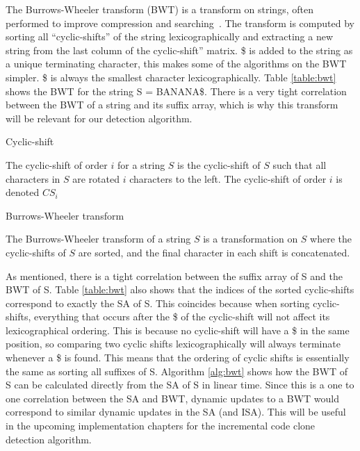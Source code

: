 The Burrows-Wheeler transform (BWT) is a transform on strings, often performed to improve
compression and searching~\cite{BWT}. The transform is computed by sorting all
``cyclic-shifts'' of the string lexicographically and extracting a new string from the
last column of the cyclic-shift'' matrix. \$ is added to the string as a unique
terminating character, this makes some of the algorithms on the BWT simpler. \$ is always
the smallest character lexicographically. Table \ref{table:bwt} shows the BWT for the
string S = BANANA\$. There is a very tight correlation between the BWT of a string and its
suffix array, which is why this transform will be relevant for our detection algorithm.

\begin{definition}{Cyclic-shift}

    The cyclic-shift of order $i$ for a string $S$ is the cyclic-shift of $S$ such that
    all characters in $S$ are rotated $i$ characters to the left. The cyclic-shift of
    order $i$ is denoted $CS_i$

\end{definition}

\begin{definition}{Burrows-Wheeler transform}

    The Burrows-Wheeler transform of a string $S$ is a transformation on $S$ where the
    cyclic-shifts of $S$ are sorted, and the final character in each shift is concatenated.

\end{definition}

As mentioned, there is a tight correlation between the suffix array of S and the BWT of S.
Table \ref{table:bwt} also shows that the indices of the sorted cyclic-shifts correspond
to exactly the SA of S. This coincides because when sorting cyclic-shifts, everything that
occurs after the \$ of the cyclic-shift will not affect its lexicographical ordering. This
is because no cyclic-shift will have a \$ in the same position, so comparing two cyclic
shifts lexicographically will always terminate whenever a \$ is found. This means that the
ordering of cyclic shifts is essentially the same as sorting all suffixes of S. Algorithm
\ref{alg:bwt} shows how the BWT of S can be calculated directly from the SA of S in linear
time. Since this is a one to one correlation between the SA and BWT, dynamic updates to a
BWT would correspond to similar dynamic updates in the SA (and ISA). This will be useful
in the upcoming implementation chapters for the incremental code clone detection
algorithm.

